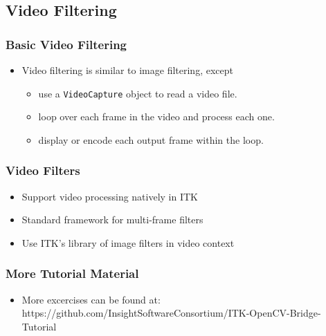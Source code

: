 \subsection{Video Filtering}


\begin{frame}
\frametitle{Basic Video Filtering}
\begin{center}
\begin{itemize}
\item Video filtering is similar to image filtering, except
  \begin{itemize}
  \item use a {\tt VideoCapture} object to read a video file.
  \item loop over each frame in the video and process each one.
  \item display or encode each output frame within the loop.
  \end{itemize}
\end{itemize}
\end{center}
\end{frame}



\begin{frame}
\frametitle{Video Filters}
\begin{itemize}
\item Support video processing natively in ITK
\item Standard framework for multi-frame filters
\item Use ITK's library of image filters in video context
\end{itemize}
\end{frame}


\begin{frame}
\frametitle{More Tutorial Material}
\begin{itemize}
\item  More excercises can be found at:  https://github.com/InsightSoftwareConsortium/ITK-OpenCV-Bridge-Tutorial 
\end{itemize}
\end{frame}




